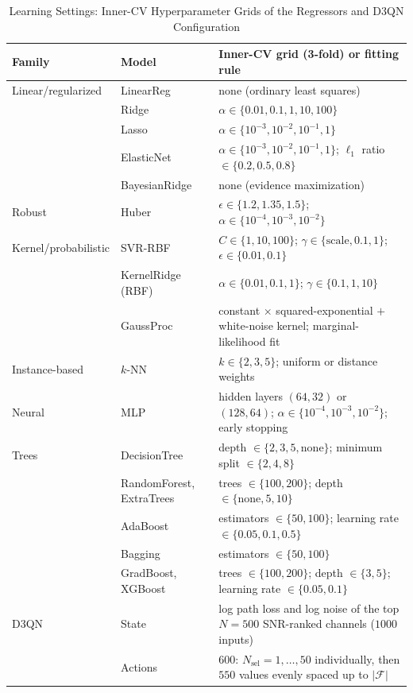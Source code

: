 \documentclass[correspondence]{IEEEtaes}
\begin{document}
\begin{table}[!t]
\caption{Learning Settings: Inner-CV Hyperparameter Grids of the Regressors and D3QN
Configuration}
\label{tab:mlparams}
\tablefont
\setlength{\tabcolsep}{3pt}
\renewcommand{\arraystretch}{1.12}
\begin{tabular*}{\textwidth}{@{\extracolsep{\fill}}l l l@{}}
\hline
Family & Model & Inner-CV grid (3-fold) or fitting rule\\
\hline
Linear/regularized & LinearReg & none (ordinary least squares)\\
 & Ridge & $\alpha\in\{0.01,0.1,1,10,100\}$\\
 & Lasso & $\alpha\in\{10^{-3},10^{-2},10^{-1},1\}$\\
 & ElasticNet & $\alpha\in\{10^{-3},10^{-2},10^{-1},1\}$; $\ell_1$ ratio $\in\{0.2,0.5,0.8\}$\\
 & BayesianRidge & none (evidence maximization)\\
Robust & Huber & $\epsilon\in\{1.2,1.35,1.5\}$; $\alpha\in\{10^{-4},10^{-3},10^{-2}\}$\\
Kernel/probabilistic & SVR-RBF & $C\in\{1,10,100\}$; $\gamma\in\{\text{scale},0.1,1\}$; $\epsilon\in\{0.01,0.1\}$\\
 & KernelRidge (RBF) & $\alpha\in\{0.01,0.1,1\}$; $\gamma\in\{0.1,1,10\}$\\
 & GaussProc & constant $\times$ squared-exponential $+$ white-noise kernel; marginal-likelihood fit\\
Instance-based & $k$-NN & $k\in\{2,3,5\}$; uniform or distance weights\\
Neural & MLP & hidden layers $(64,32)$ or $(128,64)$; $\alpha\in\{10^{-4},10^{-3},10^{-2}\}$; early stopping\\
Trees & DecisionTree & depth $\in\{2,3,5,\text{none}\}$; minimum split $\in\{2,4,8\}$\\
 & RandomForest, ExtraTrees & trees $\in\{100,200\}$; depth $\in\{\text{none},5,10\}$\\
 & AdaBoost & estimators $\in\{50,100\}$; learning rate $\in\{0.05,0.1,0.5\}$\\
 & Bagging & estimators $\in\{50,100\}$\\
 & GradBoost, XGBoost & trees $\in\{100,200\}$; depth $\in\{3,5\}$; learning rate $\in\{0.05,0.1\}$\\
\hline
D3QN & State & log path loss and log noise of the top $N=500$ SNR-ranked channels ($1000$ inputs)\\
 & Actions & $600$: $N_{\text{sel}}=1,\dots,50$ individually, then $550$ values evenly spaced up to $|\mathcal{F}|$\\

\end{tabular*}
\end{table}
\end{document}
